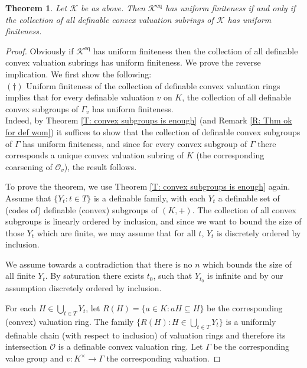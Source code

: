 \documentclass[11pt]{amsart}
\DeclareMathOperator{\eq}{eq}
\newtheorem{theorem}{Theorem}[section]
\theoremstyle{definition}
\newcommand{\CK}{{\mathcal K}}
\newcommand{\CO}{{\mathcal O}}
\newcommand{\0}{\emptyset}
\def\sub{\subseteq}
\begin{document}
\begin{theorem}\label{T:Main, UF iff conv val rings}
    Let $\CK$ be as above. Then $\CK^{\eq}$ has uniform finiteness if and only if the collection of all definable convex valuation subrings of $\CK$ has uniform finiteness.
\end{theorem}
\begin{proof}
Obviously if $\CK^{\eq}$ has uniform finiteness then the collection of all definable convex valuation subrings has uniform finiteness. We prove the reverse implication. We first show the following: \\

\noindent $(\dagger)$ Uniform finiteness of the collection of definable convex  valuation rings implies that for every definable valuation $v$ on $K$, the collection of all definable convex subgroups of $\Gamma_v$ has uniform finiteness.\\


Indeed, by Theorem \ref{T: convex subgroups is enough} (and Remark \ref{R: Thm ok for def wom}) it suffices to show that the collection of definable convex subgroups of $\Gamma$ has uniform finiteness, and since for every convex subgroup of $\Gamma$ there corresponds a unique convex valuation subring of $K$ (the corresponding coarsening of $\CO_v$), the result follows.
    
    To prove the theorem, we use Theorem \ref{T: convex subgroups is enough} again. Assume that $\{Y_t:t\in T\}$ is a definable family, with each $Y_t$ a definable set of (codes of) definable (convex) subgroups of $(K,+)$. The collection of all convex subgroups is linearly ordered by inclusion, and since we want to bound the size of those $Y_t$ which are finite, we may assume that for all $t$, $Y_t$ is discretely ordered by inclusion.  

    We assume towards a contradiction that there is no $n$ which bounds the size of all finite $Y_t$. By saturation there exists $t_0$, such that $Y_{t_0}$ is infinite and by our assumption discretely ordered by inclusion.
	

    
    For each  $H\in \bigcup_{t\in T} Y_t$, let $R(H)=\{a\in K: aH\sub H\}$ be the corresponding (convex) valuation ring. The family $\{R(H):H\in \bigcup_{t\in T}Y_{t}\}$ is a uniformly definable chain (with respect to inclusion) of valuation rings  and therefore its intersection $\CO$ is a definable convex valuation ring. Let $\Gamma$ be the corresponding value group and $v:K^\times\to \Gamma$ the corresponding valuation.
	

\end{proof}
\end{document}
